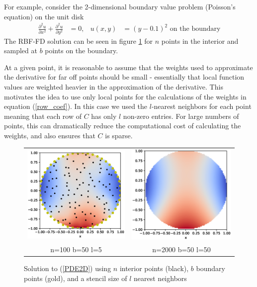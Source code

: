 \documentclass[12pt]{article}
\begin{document}
For example, consider the 2-dimensional boundary value problem (Poisson's equation) on the unit disk
\begin{align}
	\frac{\partial ^2u}{\partial x^2} + \frac{\partial ^2u}{\partial y^2} &= 0, & u(x,y)&=(y-0.1)^2 \text{ on the boundary}  \label{PDE2D}
\end{align}
The RBF-FD solution can be seen in figure \ref{2Dsolutions} for $n$ points in the interior and sampled at $b$ points on the boundary.

At a given point, it is reasonable to assume that the weights used to approximate the derivative for far off points should be small - essentially that local function values are weighted heavier in the approximation of the derivative. This motivates the idea to use only local points for the calculations of the weights in equation (\ref{row_coef}). In this case we used the $l$-nearest neighbors for each point meaning that each row of $C$ has only $l$ non-zero entries. For large numbers of points, this can dramatically reduce the computational cost of calculating the weights, and also ensures that $C$ is sparse. 

\begin{figure}[ht]
	\caption{Solution to (\ref{PDE2D}) using $n$ interior points (black), $b$ boundary points (gold), and a stencil size of $l$ nearest neighbors}
	\begin{tabular}{cc}
		\includegraphics[width=.5\textwidth]{2D_n100_b50} & \includegraphics[width=.5\textwidth]{2D_n2000_b50_l50} \\
		n=100 \phantom{==} b=50 \phantom{==} l=5 & n=2000 \phantom{==} b=50 \phantom{==} l=50 
	\end{tabular}
	\label{2Dsolutions}
	\centering
\end{figure}
\end{document}

